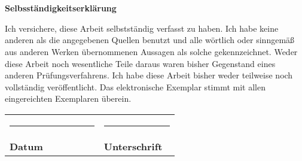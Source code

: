 \chapter*{}

\vspace{-14em}
\textbf{Selbsst\"andigkeitserkl\"arung}\\

\noindent

Ich versichere, diese Arbeit selbstst\"andig verfasst zu haben. Ich habe keine anderen als die
angegebenen Quellen benutzt und alle w\"ortlich oder sinngem\"a{\ss} aus anderen Werken \"ubernommenen
Aussagen als solche gekennzeichnet. Weder diese Arbeit noch wesentliche Teile daraus waren bisher
Gegenstand eines anderen Pr\"ufungsverfahrens. Ich habe diese Arbeit bisher weder teilweise noch
vollst\"andig ver\"offentlicht.
Das elektronische Exemplar stimmt mit allen eingereichten Exemplaren \"uberein.

\vspace{8em}
\noindent\begin{tabular}{p{0.5\linewidth}p{0.4\linewidth}}
\rule{0.25\textwidth}{0.4pt} & \rule{0.4\textwidth}{0.4pt} \\
\textbf{Datum} & \textbf{Unterschrift}  \\
\end{tabular}
